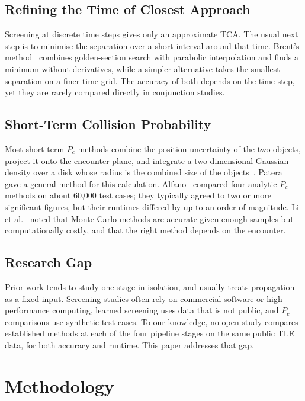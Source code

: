 \documentclass[runningheads]{llncs}
\begin{document}
\subsection{Refining the Time of Closest Approach}
Screening at discrete time steps gives only an approximate TCA. The usual next step is to minimise the separation over a short interval around that time. Brent's method~\cite{b22} combines golden-section search with parabolic interpolation and finds a minimum without derivatives, while a simpler alternative takes the smallest separation on a finer time grid. The accuracy of both depends on the time step, yet they are rarely compared directly in conjunction studies.

\subsection{Short-Term Collision Probability}
Most short-term $P_c$ methods combine the position uncertainty of the two objects, project it onto the encounter plane, and integrate a two-dimensional Gaussian density over a disk whose radius is the combined size of the objects~\cite{b10}. Patera~\cite{b11} gave a general method for this calculation. Alfano~\cite{b23} compared four analytic $P_c$ methods on about 60,000 test cases; they typically agreed to two or more significant figures, but their runtimes differed by up to an order of magnitude. Li et al.~\cite{b24} noted that Monte Carlo methods are accurate given enough samples but computationally costly, and that the right method depends on the encounter.

\subsection{Research Gap}
Prior work tends to study one stage in isolation, and usually treats propagation as a fixed input. Screening studies often rely on commercial software or high-performance computing, learned screening uses data that is not public, and $P_c$ comparisons use synthetic test cases. To our knowledge, no open study compares established methods at each of the four pipeline stages on the same public TLE data, for both accuracy and runtime. This paper addresses that gap.

\section{Methodology}
\label{sec:method}
\end{document}
